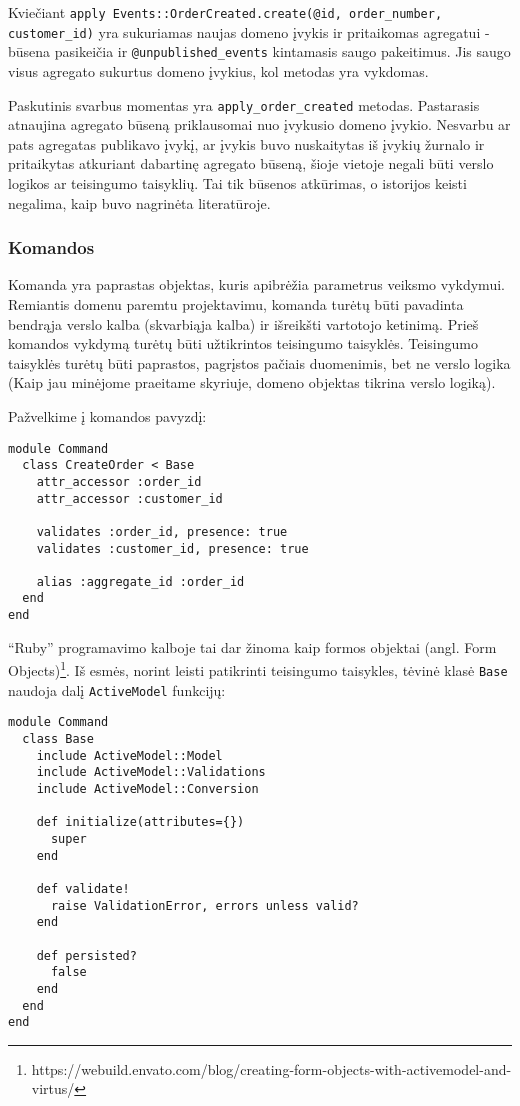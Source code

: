 Kviečiant \lstinline{apply Events::OrderCreated.create(@id, order_number, customer_id)} yra sukuriamas naujas domeno įvykis ir pritaikomas agregatui - būsena pasikeičia ir \lstinline|@unpublished_events| kintamasis saugo pakeitimus. Jis saugo visus agregato sukurtus domeno įvykius, kol metodas yra vykdomas.

Paskutinis svarbus momentas yra \lstinline|apply_order_created| metodas. Pastarasis atnaujina agregato būseną priklausomai nuo įvykusio domeno įvykio. Nesvarbu ar pats agregatas publikavo įvykį, ar įvykis buvo nuskaitytas iš įvykių žurnalo ir pritaikytas atkuriant dabartinę agregato būseną, šioje vietoje negali būti verslo logikos ar teisingumo taisyklių. Tai tik būsenos atkūrimas, o istorijos keisti negalima, kaip buvo nagrinėta literatūroje.

\subsubsection{Komandos}

Komanda yra paprastas objektas, kuris apibrėžia parametrus veiksmo vykdymui. Remiantis domenu paremtu projektavimu, komanda turėtų būti pavadinta bendrąja verslo kalba (skvarbiąja kalba) ir išreikšti vartotojo ketinimą. Prieš komandos vykdymą turėtų būti užtikrintos teisingumo taisyklės. Teisingumo taisyklės turėtų būti paprastos, pagrįstos pačiais duomenimis, bet ne verslo logika (Kaip jau minėjome praeitame skyriuje, domeno objektas tikrina verslo logiką).

Pažvelkime į komandos pavyzdį:

\begin{lstlisting}
module Command
  class CreateOrder < Base
    attr_accessor :order_id
    attr_accessor :customer_id

    validates :order_id, presence: true
    validates :customer_id, presence: true

    alias :aggregate_id :order_id
  end
end
\end{lstlisting}

``Ruby'' programavimo kalboje tai dar žinoma kaip formos objektai (angl. Form Objects)\footnote{https://webuild.envato.com/blog/creating-form-objects-with-activemodel-and-virtus/}. Iš esmės, norint leisti patikrinti teisingumo taisykles, tėvinė klasė \lstinline|Base| naudoja dalį \lstinline|ActiveModel| funkcijų:

\begin{lstlisting}
module Command
  class Base
    include ActiveModel::Model
    include ActiveModel::Validations
    include ActiveModel::Conversion

    def initialize(attributes={})
      super
    end

    def validate!
      raise ValidationError, errors unless valid?
    end

    def persisted?
      false
    end
  end
end
\end{lstlisting}

